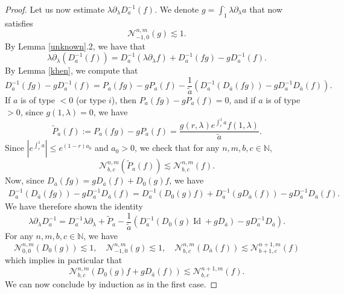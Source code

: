 \documentclass[11 pt]{amsart}
\theoremstyle{definition}
\theoremstyle{remark}
\numberwithin{equation}{section}
\begin{document}
\begin{proof}
  
  Let us now estimate $\lambda \partial_\lambda D_a^{-1}(f).$ We denote $g = \int_1^. \lambda \partial_{\lambda} a$ that now satisfies
\[ \mathcal{N}_{- 1, 0}^{n, m} (g) \lesssim 1. \]
By Lemma \ref{unknown}.2, we have that
\[ \lambda \partial_{\lambda} (D_a^{- 1} (f)) = D_a^{- 1} (\lambda
   \partial_{\lambda} f) + D_a^{- 1} (f g) - g D_a^{- 1} (f) . \]
By Lemma \ref{khen}, we compute that
\[ D_a^{- 1} (f g) - g D_a^{- 1} (f) = P_a (f g) - g P_a (f) -
   \frac{1}{\widetilde{a}} (D_a^{- 1} (D_{\bar{a}} (f g)) - g D_a^{- 1}
   D_{\bar{a}} (f)) . \]
If $a$ is of type $< 0$ (or type $i$), then $P_a (f g) - g P_a (f) = 0$, and
if $a$ is of type $> 0$, since $g (1, \lambda) = 0$, we have
\[ \widetilde{P}_a (f) := P_a (f g) - g P_a (f) = \frac{g (r, \lambda)
   e^{\int_r^1 a} f (1, \lambda)}{\widetilde{a}} . \]
Since $\left| e^{\int_r^1 a} \right| \leqslant e^{(1 - r) a_0}$ and $a_0 > 0$,
we check that for any $n, m, b, c \in \mathbb{N}$,
\[ \mathcal{N}_{b, c}^{n, m} (\widetilde{P}_a (f)) \lesssim \mathcal{N}_{b, c}^{n,
   m} (f) . \]
Now, since $D_{\bar{a}} (f g) = g D_{\bar{a}} (f) + D_0 (g) f$, we have
\begin{eqnarray*}
D_a^{- 1} (D_{\bar{a}} (f g)) - g D_a^{- 1} D_{\bar{a}} (f) =  D_a^{- 1} (D_0 (g) f) + D_a^{- 1} (g D_{\bar{a}} (f)) - g D_a^{- 1}  D_{\bar{a}} (f).
\end{eqnarray*}
We have therefore shown the identity
\[ \lambda \partial_{\lambda} D_a^{- 1} = D_a^{- 1} \lambda \partial_{\lambda}
   + \widetilde{P}_a - \frac{1}{\widetilde{a}} (D_a^{- 1} (D_0 (g) \operatorname{Id} + g
   D_{\bar{a}}) - g D_a^{- 1} D_{\bar{a}}) . \]
For any $n, m, b, c \in \mathbb{N}$, we have
\[ \mathcal{N}_{0, 0}^{n, m} (D_0 (g)) \lesssim 1, \quad \mathcal{N}_{- 1, 0}^{n, m} (g) \lesssim 1, \quad 
\mathcal{N}_{b, c}^{n, m} (D_{\bar{a}} (f)) \lesssim
   \mathcal{N}_{b + 1, c}^{n + 1, m} (f) \]
which implies in particular that
\[ \mathcal{N}_{b, c}^{n, m} (D_0 (g) f + g D_{\bar{a}} (f)) \lesssim
   \mathcal{N}_{b, c}^{n + 1, m} (f) . \]
We can now conclude by induction as in the first case.


\end{proof}
\end{document}
